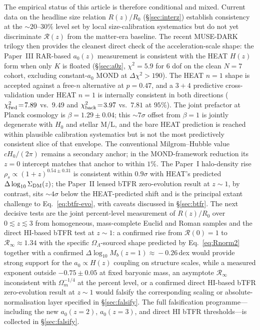 \documentclass[twocolumn,letterpaper]{aastex631}
\newcommand{\azero}{a_0}
\begin{document}
The empirical status of this article is therefore conditional
and mixed.  Current data on the headline size relation
$R(z)/R_{0}$ (\S\ref{sec:interz}) establish consistency at the
$\sim 20$--$30\%$ level set by local size-calibration systematics
but do not yet discriminate $\mathcal{R}(z)$ from the
matter-era baseline.  The recent MUSE-DARK trilogy then provides
the cleanest direct check of the acceleration-scale shape:
the Paper~III RAR-based $\azero(z)$ measurement is consistent
with the HEAT $H(z)$ form when only $K$ is floated
(\S\ref{sec:a0z}, $\chi^{2}\!=\!5.9$ for $6$ dof on the clean
$N\!=\!7$ cohort, excluding constant-$\azero$ MOND at
$\Delta\chi^{2}\!>\!190$).  The HEAT $n\!=\!1$ shape is
accepted against a free-$n$ alternative at $p\!=\!0.47$, and a
$3\!+\!4$ predictive cross-validation under HEAT $n\!=\!1$ is
internally consistent in both directions
($\chi^{2}_{\rm fwd}\!=\!7.89$ vs.\ $9.49$ and
$\chi^{2}_{\rm back}\!=\!3.97$ vs.\ $7.81$ at $95\%$).  The
joint prefactor at Planck cosmology is
$\beta\!=\!1.29\!\pm\!0.04$; this $\sim\!7\sigma$ offset from
$\beta\!=\!1$ is jointly degenerate with $H_{0}$ and stellar
M/L, and the bare HEAT prediction is reached within plausible
calibration systematics but is not the most predictively
consistent slice of that envelope.  The conventional
Milgrom--Hubble value $cH_0/(2\pi)$ remains a secondary anchor;
in the MOND-framework reduction its $z=0$ intercept matches
that anchor to within $1\%$.  The
Paper~I halo-density rise
$\rho_{s}\!\propto\!(1\!+\!z)^{0.54\pm 0.31}$ is consistent
within $0.9\sigma$ with HEAT's predicted $\Delta\log_{10}\Sigma_{\rm
DM}(z)$; the Paper~II lensed bTFR zero-evolution result at
$z\!\sim\!1$, by contrast, sits $\sim 4\sigma$ below the
HEAT-predicted shift and is the principal extant challenge to
Eq.~\ref{eq:btfr-evo},
with caveats discussed in \S\ref{sec:btfr}.  The next decisive
tests are the joint percent-level measurement of
$R(z)/R_{0}$ over $0\!\lesssim\!z\!\lesssim\!3$ from
homogeneous, mass-complete Euclid and Roman samples and the
direct HI-based bTFR test at $z\!\sim\!1$: a confirmed rise
from $\mathcal{R}(0)\!=\!1$ to
$\mathcal{R}_{\infty}\!\approx\!1.34$ with the specific
$\Omega_{\Lambda}$-sourced shape predicted by
Eq.~\ref{eq:Rnorm2} together with a confirmed
$\Delta\log_{10}M_{b}(z\!=\!1)\!\approx\!-0.26$\,dex would
provide strong support for the
$\azero\propto H(z)$ coupling on structure scales, while a
measured exponent outside $-0.75\pm 0.05$ at fixed baryonic
mass, an asymptote $\mathcal{R}_{\infty}$ inconsistent with
$\Omega_{m}^{-1/4}$ at the percent level, or a confirmed direct
HI-based bTFR zero-evolution result at $z\!\sim\!1$ would falsify
the corresponding scaling or absolute-normalisation layer specified
in \S\ref{sec:falsify}.  The full
falsification programme---including
the new $\azero(z\!=\!2)$, $\azero(z\!=\!3)$, and direct HI bTFR
thresholds---is collected in \S\ref{sec:falsify}.
\end{document}
